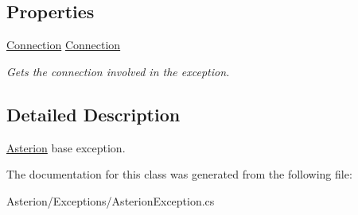 \subsection*{Properties}
\begin{DoxyCompactItemize}
\item 
\hypertarget{classAsterion_1_1Exceptions_1_1AsterionException_a6a5fc0e15d21f85675b50c752e791a63}{\hyperlink{classAsterion_1_1Connection}{Connection} \hyperlink{classAsterion_1_1Exceptions_1_1AsterionException_a6a5fc0e15d21f85675b50c752e791a63}{Connection}}\label{classAsterion_1_1Exceptions_1_1AsterionException_a6a5fc0e15d21f85675b50c752e791a63}

\begin{DoxyCompactList}\small\item\em Gets the connection involved in the exception. \end{DoxyCompactList}\end{DoxyCompactItemize}


\subsection{Detailed Description}
\hyperlink{namespaceAsterion}{Asterion} base exception. 

The documentation for this class was generated from the following file\-:\begin{DoxyCompactItemize}
\item 
Asterion/\-Exceptions/Asterion\-Exception.\-cs\end{DoxyCompactItemize}
